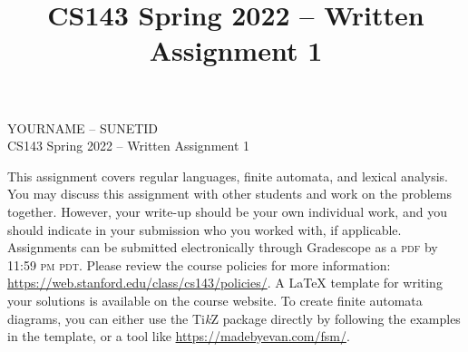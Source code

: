\documentclass[11pt]{article}
\title{CS143 Spring 2022 -- Written Assignment 1}
\newcommand{\tikzname}{Ti\emph{k}Z}
\begin{document}
\begin{center}
\LARGE YOURNAME -- SUNETID \\
\LARGE CS143 Spring 2022 -- Written Assignment 1
\end{center}

This assignment covers regular languages, finite automata, and lexical analysis. You may discuss this assignment with other students and work on the problems together. However, your write-up should be your own individual work, and you should indicate in your submission who you worked with, if applicable. Assignments can be submitted electronically through Gradescope as a \textsc{pdf} by 11:59 \textsc{pm pdt}. Please review the course policies for more information: \url{https://web.stanford.edu/class/cs143/policies/}. A \LaTeX{} template for writing your solutions is available on the course website. To create finite automata diagrams, you can either use the \tikzname{} package directly by following the examples in the template, or a tool like \url{https://madebyevan.com/fsm/}.
\end{document}
